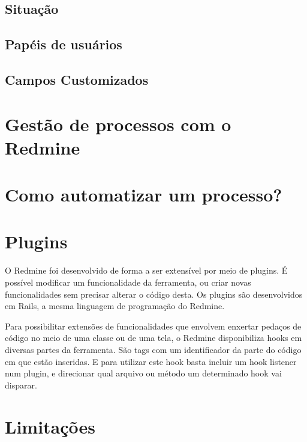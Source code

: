 \subsection{Situação}\label{subsection:redmine-estrutura_basica-status}

\subsection{Papéis de usuários}\label{subsection:redmine-estrutura_basica-role}

\subsection{Campos Customizados}\label{subsection:redmine-estrutura_basica-custom_fields}


\section{Gestão de processos com o Redmine}\label{sec:redmine-gestao_processos}


\section{Como automatizar um processo?}\label{sec:redmine-automatizar_processo}

\section{Plugins}\label{sec:redmine-plugins}
O Redmine foi desenvolvido de forma a ser extensível por meio de plugins. É possível modificar um funcionalidade da ferramenta, ou criar novas funcionalidades sem precisar alterar o código desta. Os plugins são desenvolvidos em Rails, a mesma linguagem de programação do Redmine. 

Para possibilitar extensões de funcionalidades que envolvem enxertar pedaços de código no meio de uma classe ou de uma tela, o Redmine disponibiliza hooks em diversas partes da ferramenta. São tags com um identificador da parte do código em que estão inseridas. E para utilizar este hook basta incluir um hook listener num plugin, e direcionar qual arquivo ou método um determinado hook vai disparar.

\section{Limitações}\label{sec:redmine-limitacoes}

